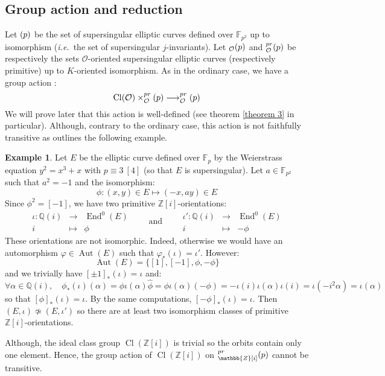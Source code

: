 \documentclass[a4paper,10pt]{report}
\theoremstyle{definition}
\theoremstyle{plain}
\theoremstyle{definition}
\newtheorem{example}[definition]{Example}
\newcommand{\ie}{\emph{i.e.}\ }
\newcommand{\Z}{\mathbb{Z}}
\newcommand{\Q}{\mathbb{Q}}
\newcommand{\F}{\mathbb{F}}
\newcommand{\mO}{\mathcal{O}}
\renewcommand{\(}{\left(}
\renewcommand{\)}{\right)}
\DeclareMathOperator{\End}{End}
\DeclareMathOperator{\Aut}{Aut}
\DeclareMathOperator{\Cl}{Cl}
\let\SS\relax
\DeclareMathOperator{\SS}{SS}
\begin{document}
\subsection{Group action and reduction}

Let $\SS(p)$ be the set of supersingular elliptic curves defined over $\F_{p^2}$ up to isomorphism (\ie the set of supersingular $j$-invariants). Let $\SS_{\mO}(p)$ and $\SS_{\mO}^{pr}(p)$ be respectively the sets $\mO$-oriented supersingular elliptic curves (respectively primitive) up to $K$-oriented isomorphism.  As in the ordinary case,  we have a group action :
\[\Cl(\mO)\times \SS_{\mO}^{pr}(p) \longrightarrow \SS_{\mO}^{pr}(p)\]
We will prove later that this action is well-defined (see theorem \ref{theorem 3} in particular).  Although,  contrary to the ordinary case,  this action is not faithfully transitive as outlines the following example.

\begin{example}\label{example 1}
Let $E$ be the elliptic curve defined over $\F_p$ by the Weierstrass equation $y^2=x^3+x$ with $p\equiv 3 \ [4]$ (so that $E$ is supersingular).  Let $a\in\F_{p^2}$ such that $a^2=-1$ and the isomorphism:
\[\phi : (x,y)\in E \longmapsto (-x,ay)\in E\]
Since $\phi^2=[-1]$,  we have two primitive $\Z[i]$-orientations:
\[\begin{array}{rcl}
\iota : \Q(i) & \longrightarrow & \End^0(E)\\
i & \longmapsto & \phi
\end{array} 
\qquad \mbox{and} \qquad
 \begin{array}{rcl}
\iota' : \Q(i) & \longrightarrow & \End^0(E)\\
i & \longmapsto & -\phi
\end{array}\]
These orientations are not isomorphic.  Indeed,  otherwise we would have an automorphism $\varphi\in\Aut(E)$ such that $\varphi_*(\iota)=\iota'$.  However:
\[\Aut(E)=\{[1],[-1],\phi,-\phi\}\]
and we trivially have $[\pm 1]_*(\iota)=\iota$ and:
\[\forall \alpha\in \Q(i), \quad \phi_*(\iota)(\alpha)=\phi\iota(\alpha)\widehat{\phi}=\phi\iota(\alpha)(-\phi)=-\iota(i)\iota(\alpha)\iota(i)=\iota(-i^2\alpha)=\iota(\alpha)\]
so that $[\phi]_*(\iota)=\iota$.  By the same computations,  $[-\phi]_*(\iota)=\iota$.  Then $(E,\iota)\not\simeq (E,\iota')$ so there are at least two isomorphism classes of primitive $\Z[i]$-orientations.  

Although,  the ideal class group $\Cl(\Z[i])$ is trivial so the orbits contain only one element.  Hence,  the group action of $\Cl(\Z[i])$ on $\SS_{\Z[i]}^{pr}(p)$ cannot be transitive.
\end{example}
\end{document}
